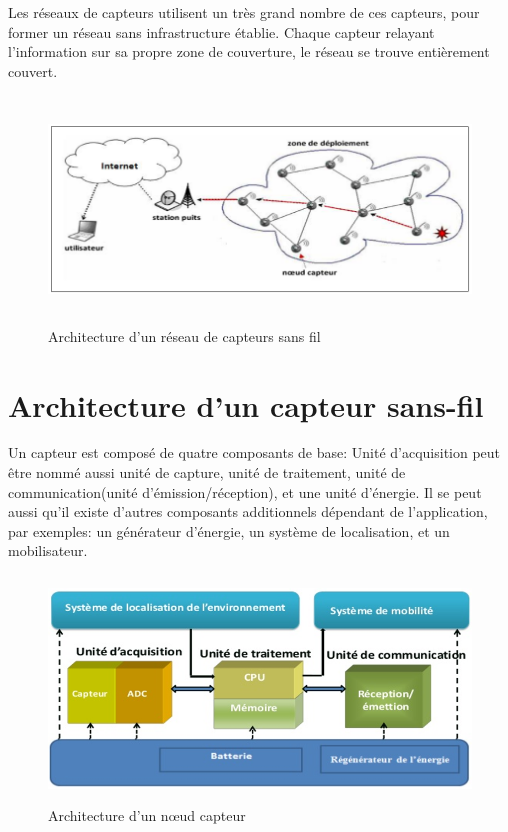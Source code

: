 Les réseaux de capteurs utilisent un très grand nombre de ces capteurs, pour former un réseau sans infrastructure établie. Chaque capteur relayant l'information sur sa propre zone de couverture, le réseau se trouve entièrement couvert.

\begin{figure}[h]
	\centering
	\includegraphics[width=14cm,height=6cm]{Chap1/2.png}
	\caption{Architecture d’un réseau de capteurs sans fil}
	\label{fig:ARCSF}
\end{figure}

\section{Architecture d’un capteur sans-fil}
Un capteur est composé de quatre composants de base: Unité d’acquisition peut être nommé aussi unité de capture, unité de traitement, unité de communication(unité d'émission/réception), et une unité d'énergie. 
Il se peut aussi qu'il existe d'autres composants additionnels dépendant de l'application, par exemples: un générateur d'énergie, un système de localisation, et un mobilisateur.\cite{mekidicheetude}

\begin{figure}[h]
	\centering
	\includegraphics[width=14cm,height=6cm]{Chap1/3.png}
	\caption{Architecture d’un nœud capteur}
	\label{fig:ANC}
\end{figure}

